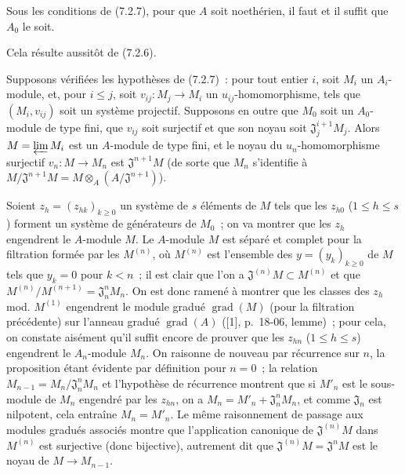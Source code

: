 \begin{corollary}[7.2.8]
\label{0.7.2.8-fr}
Sous les conditions de \textup{(7.2.7)}, pour que $A$ soit noethérien, il faut et il
suffit que $A_0$ le soit.
\end{corollary}

Cela résulte aussitôt de (7.2.6).

\begin{proposition}[7.2.9]
\label{0.7.2.9-fr}
Supposons vérifiées les hypothèses de \textup{(7.2.7)}~: pour tout entier $i$, soit
$M_i$ un $A_i$-module, et, pour $i\leq j$, soit
$v_{ij}:M_j\to M_i$ un $u_{ij}$-homomorphisme, tels que $(M_i,v_{ij})$ soit un
système projectif. Supposons en outre que $M_0$ soit un $A_0$-module de type
fini, que $v_{ij}$ soit surjectif et que son noyau soit
$\mathfrak J_j^{i+1}M_j$. Alors $M=\varprojlim M_i$ est un $A$-module de type
fini, et le noyau du $u_n$-homomorphisme surjectif $v_n:M\to M_n$ est
$\mathfrak J^{n+1}M$ \textup{(de sorte que $M_n$ s'identifie à
$M/\mathfrak J^{n+1}M=M\otimes_A(A/\mathfrak J^{n+1})$)}.
\end{proposition}

Soient $z_h=(z_{hk})_{k\geq0}$ un système de $s$ éléments de $M$ tels que les
$z_{h0}$ ($1\leq h\leq s$) forment un système de générateurs de $M_0$~; on va
montrer que les $z_h$ engendrent le $A$-module $M$. Le $A$-module $M$ est
séparé et complet pour la filtration formée par les $M^{(n)}$, où $M^{(n)}$
est l'ensemble des $y=(y_k)_{k\geq0}$ de $M$ tels que $y_k=0$ pour $k<n$~;
il est clair que l'on a $\mathfrak J^{(n)}M\subset M^{(n)}$ et que
$M^{(n)}/M^{(n+1)}=\mathfrak J_n^nM_n$. On est donc ramené à montrer que les
classes des $z_h$ mod. $M^{(1)}$ engendrent le module gradué
$\operatorname{grad}(M)$ (pour la filtration précédente) sur l'anneau gradué
$\operatorname{grad}(A)$ ([1], p.~18-06, lemme)~; pour cela, on constate
aisément qu'il suffit encore de prouver que les $z_{hn}$ ($1\leq h\leq s$)
engendrent le $A_n$-module $M_n$. On raisonne de nouveau par récurrence sur
$n$, la proposition étant évidente par définition pour $n=0$~; la relation
$M_{n-1}=M_n/\mathfrak J_n^nM_n$ et l'hypothèse de récurrence montrent que si
$M'_n$ est le sous-module de $M_n$ engendré par les $z_{hn}$, on a
$M_n=M'_n+\mathfrak J_n^nM_n$, et comme $\mathfrak J_n$ est nilpotent, cela
entraîne $M_n=M'_n$. Le même raisonnement de passage aux modules gradués
associés montre que l'application canonique de $\mathfrak J^{(n)}M$ dans
$M^{(n)}$ est surjective (donc bijective), autrement dit que
$\mathfrak J^{(n)}M=\mathfrak J^nM$ est le noyau de $M\to M_{n-1}$.

